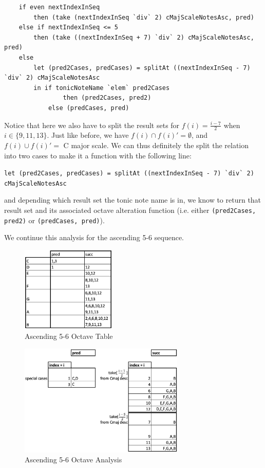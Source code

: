 \documentclass{report}
\begin{document}
\begin{verbatim}
    if even nextIndexInSeq 
        then (take (nextIndexInSeq `div` 2) cMajScaleNotesAsc, pred)
    else if nextIndexInSeq <= 5
        then (take ((nextIndexInSeq + 7) `div` 2) cMajScaleNotesAsc, pred)
    else 
        let (pred2Cases, predCases) = splitAt ((nextIndexInSeq - 7) `div` 2) cMajScaleNotesAsc
        in if tonicNoteName `elem` pred2Cases 
                then (pred2Cases, pred2) 
            else (predCases, pred)
\end{verbatim}

Notice that here we also have to split the result sets for $f(i) = \frac{i-7}{2}$ when $i \in \{9,11,13\}$. Just like before, we have $f(i) \cap f(i)' = \emptyset$, and $f(i) \cup f(i)' =$ C major scale. We can thus definitely the split  the relation into two cases to make it a function with the following line:

\verb.let (pred2Cases, predCases) = splitAt ((nextIndexInSeq - 7) `div` 2) cMajScaleNotesAsc.

and depending which result set the tonic note name is in, we know to return that result set and its associated octave alteration function (i.e. either \verb.(pred2Cases, pred2). or \verb.(predCases, pred).).

We continue this analysis for the ascending 5-6 sequence.

\begin{figure}[h!]
\centering
\includegraphics[width=0.4\textwidth]{images/asc56_octave_grid}
  \caption{Ascending 5-6 Octave Table}
\end{figure}

\begin{figure}[h!]
\centering
\includegraphics[width=0.7\textwidth]{images/asc56_octave_analysis}
  \caption{Ascending 5-6 Octave Analysis}
\end{figure}
\newpage
\end{document}
